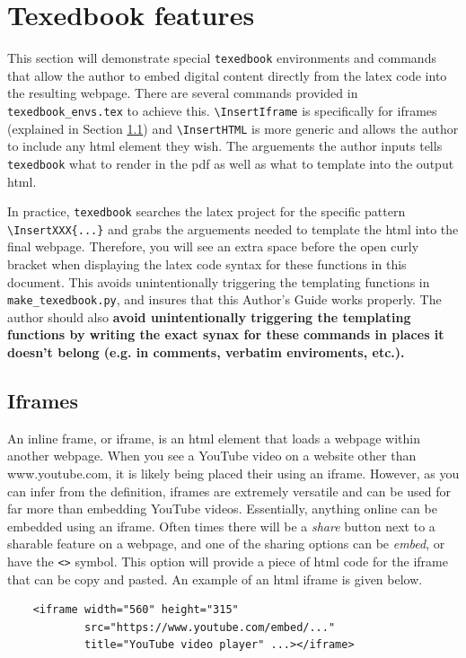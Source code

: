\documentclass{article}
\begin{document}
\section{Texedbook features}
This section will demonstrate special \verb'texedbook' environments and commands that allow the author to embed digital content directly from the latex code into the resulting webpage. There are several commands provided in \verb'texedbook_envs.tex' to achieve this. \verb'\InsertIframe' is specifically for iframes (explained in Section \ref{sec:iframes}) and \verb'\InsertHTML' is more generic and allows the author to include any html element they wish. The arguements the author inputs tells \verb'texedbook' what to render in the pdf as well as what to template into the output html. 

In practice, \verb'texedbook' searches the latex project for the specific pattern \verb'\InsertXXX{...}' and grabs the arguements needed to template the html into the final webpage. Therefore, you will see an extra space before the open curly bracket when displaying the latex code syntax for these functions in this document. This avoids unintentionally triggering the templating functions in \verb'make_texedbook.py', and insures that this Author's Guide works properly. The author should also \textbf{avoid unintentionally triggering the templating functions by writing the exact synax for these commands in places it doesn't belong (e.g. in comments, verbatim enviroments, etc.).}

\subsection{Iframes} \label{sec:iframes}
An inline frame, or iframe, is an html element that loads a webpage within another webpage. When you see a YouTube video on a website other than www.youtube.com, it is likely being placed their using an iframe. However, as you can infer from the definition, iframes are extremely versatile and can be used for far more than embedding YouTube videos. Essentially, anything online can be embedded using an iframe. Often times there will be a \textit{share} button next to a sharable feature on a webpage, and one of the sharing options can be \textit{embed}, or have the \verb'<>' symbol. This option will provide a piece of html code for the iframe that can be copy and pasted. An example of an html iframe is given below. 

\begin{verbatim}
    <iframe width="560" height="315" 
            src="https://www.youtube.com/embed/..." 
            title="YouTube video player" ...></iframe>
\end{verbatim}
\end{document}
